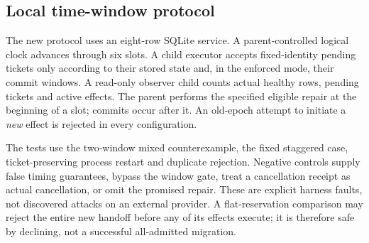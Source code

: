 \subsection{Local time-window protocol}
The new protocol uses an eight-row SQLite service. A parent-controlled logical clock advances through six slots. A child executor accepts fixed-identity pending tickets only according to their stored state and, in the enforced mode, their commit windows. A read-only observer child counts actual healthy rows, pending tickets and active effects. The parent performs the specified eligible repair at the beginning of a slot; commits occur after it. An old-epoch attempt to initiate a \emph{new} effect is rejected in every configuration.

The tests use the two-window mixed counterexample, the fixed staggered case, ticket-preserving process restart and duplicate rejection. Negative controls supply false timing guarantees, bypass the window gate, treat a cancellation receipt as actual cancellation, or omit the promised repair. These are explicit harness faults, not discovered attacks on an external provider. A flat-reservation comparison may reject the entire new handoff before any of its effects execute; it is therefore safe by declining, not a successful all-admitted migration.

